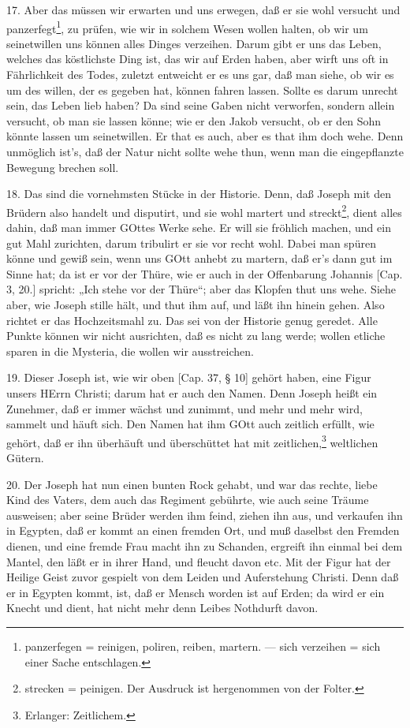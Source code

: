 17. Aber das müssen wir erwarten und uns erwegen, daß er sie wohl versucht und panzerfegt\footnote{panzerfegen = reinigen, poliren, reiben, martern. — sich verzeihen = sich einer Sache entschlagen.}, zu prüfen, wie wir in solchem Wesen wollen halten, ob wir um seinetwillen uns können alles Dinges verzeihen. Darum gibt er uns das Leben, welches das köstlichste Ding ist, das wir auf Erden haben, aber wirft uns oft in Fährlichkeit des Todes, zuletzt entweicht er es uns gar, daß man siehe, ob wir es um des willen, der es gegeben hat, können fahren lassen. Sollte es darum unrecht sein, das Leben lieb haben? Da sind seine Gaben nicht verworfen, sondern allein versucht, ob man sie lassen könne; wie er den Jakob versucht, ob er den Sohn könnte lassen um seinetwillen. Er that es auch, aber es that ihm doch wehe. Denn unmöglich ist’s, daß der Natur nicht sollte wehe thun, wenn man die eingepflanzte Bewegung brechen soll.

18. Das sind die vornehmsten Stücke in der Historie. Denn, daß Joseph mit den Brüdern also handelt und disputirt, und sie wohl martert und streckt\footnote{strecken = peinigen. Der Ausdruck ist hergenommen von der Folter.}, dient alles dahin, daß man immer GOttes Werke sehe. Er will sie fröhlich machen,
und ein gut Mahl zurichten, darum tribulirt er sie vor recht wohl. Dabei man spüren könne und gewiß sein, wenn uns GOtt anhebt zu martern, daß er’s dann gut im Sinne hat; da ist er vor der Thüre, wie er auch in der Offenbarung Johannis [Cap. 3, 20.] spricht: „Ich stehe vor der Thüre“; aber das Klopfen thut uns wehe. Siehe aber, wie Joseph stille hält, und thut ihm auf, und läßt ihn hinein gehen. Also richtet er das Hochzeitsmahl zu. Das sei von der Historie genug geredet. Alle Punkte können wir nicht ausrichten, daß es nicht zu lang werde; wollen etliche sparen in die Mysteria, die wollen wir ausstreichen.

19. Dieser Joseph ist, wie wir oben [Cap. 37, § 10] gehört haben, eine Figur unsers HErrn Christi; darum hat er auch den Namen. Denn Joseph heißt ein Zunehmer, daß er immer wächst und zunimmt, und mehr und mehr wird, sammelt und häuft sich. Den Namen hat ihm GOtt auch zeitlich erfüllt, wie gehört, daß er ihn überhäuft und überschüttet hat mit zeitlichen,\footnote{Erlanger: Zeitlichem.} weltlichen Gütern.

20. Der Joseph hat nun einen bunten Rock gehabt, und war das rechte, liebe Kind des Vaters, dem auch das Regiment gebührte, wie auch seine Träume ausweisen; aber seine Brüder werden ihm feind, ziehen ihn aus, und verkaufen ihn in Egypten, daß er kommt an einen fremden Ort, und muß daselbst den Fremden dienen, und eine fremde Frau macht ihn zu Schanden, ergreift ihn einmal bei dem Mantel, den läßt er in ihrer Hand, und fleucht davon etc. Mit der Figur hat der Heilige Geist zuvor gespielt von dem Leiden und Auferstehung Christi. Denn daß er in Egypten kommt, ist, daß er Mensch worden ist auf Erden; da wird er ein Knecht und dient, hat nicht mehr denn Leibes Nothdurft davon.

